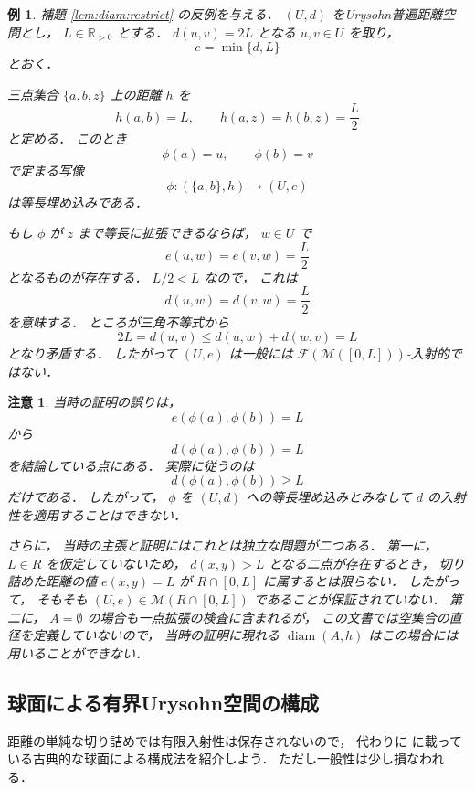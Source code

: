 \documentclass[leqno, 12pt]{jsarticle}
\newtheorem{exam}[thm]{例}
\newtheorem*{rmk}{注意}
\newcommand{\rr}{\mathbb{R}}
\DeclareMathOperator{\di}{diam}
\newcommand{\Met}[1]{\mathscr{M}(#1)}
\newcommand{\FinitePart}[1]{\mathscr{F}(#1)}
\newcommand{\FinMet}[1]{\FinitePart{\Met{#1}}}
\newcommand{\pospart}[1]{#1_{>0}}
\newcommand{\rrpos}{\pospart{\rr}}
\begin{document}
\begin{exam}\label{exam:diam:restrict-counterexample}
補題
\ref{lem:diam:restrict}
の反例を与える．
$(U,d)$
をUrysohn普遍距離空間とし，
$L\in\rrpos$
とする．
$d(u,v)=2L$
となる
$u,v\in U$
を取り，
\[
e=\min\{d,L\}
\]
とおく．

三点集合
$\{a,b,z\}$
上の距離
$h$
を
\[
h(a,b)=L,
\qquad
h(a,z)=h(b,z)=\frac{L}{2}
\]
と定める．
このとき
\[
\phi(a)=u,
\qquad
\phi(b)=v
\]
で定まる写像
\[
\phi\colon(\{a,b\},h)\to(U,e)
\]
は等長埋め込みである．

もし
$\phi$
が
$z$
まで等長に拡張できるならば，
$w\in U$
で
\[
e(u,w)=e(v,w)=\frac{L}{2}
\]
となるものが存在する．
$L/2<L$
なので，
これは
\[
d(u,w)=d(v,w)=\frac{L}{2}
\]
を意味する．
ところが三角不等式から
\[
2L=d(u,v)\le d(u,w)+d(w,v)=L
\]
となり矛盾する．
したがって
$(U,e)$
は一般には
$\FinMet{[0,L]}$-入射的ではない．
\end{exam}

\begin{rmk}\label{rmk:diameter:obsolete-proof-error}
当時の証明の誤りは，
\[
e(\phi(a),\phi(b))=L
\]
から
\[
d(\phi(a),\phi(b))=L
\]
を結論している点にある．
実際に従うのは
\[
d(\phi(a),\phi(b))\ge L
\]
だけである．
したがって，
$\phi$
を
$(U,d)$
への等長埋め込みとみなして
$d$
の入射性を適用することはできない．

さらに，
当時の主張と証明にはこれとは独立な問題が二つある．
第一に，
$L\in R$
を仮定していないため，
$d(x,y)>L$
となる二点が存在するとき，
切り詰めた距離の値
$e(x,y)=L$
が
$R\cap[0,L]$
に属するとは限らない．
したがって，
そもそも
$(U,e)\in\Met{R\cap[0,L]}$
であることが保証されていない．
第二に，
$A=\emptyset$
の場合も一点拡張の検査に含まれるが，
この文書では空集合の直径を定義していないので，
当時の証明に現れる
$\di(A,h)$
はこの場合には用いることができない．
\end{rmk}


\subsection{球面による有界Urysohn空間の構成}\label{subsec:bounded:sphere}

距離の単純な切り詰めでは有限入射性は保存されないので，
代わりに
\cite{Ury2}
に載っている古典的な球面による構成法を紹介しよう．
ただし一般性は少し損なわれる．
\end{document}
